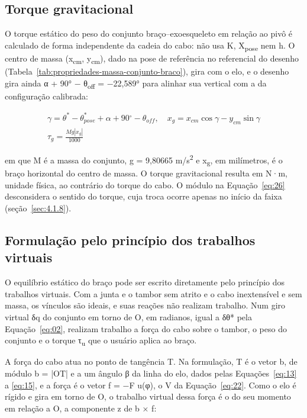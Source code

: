 \subsection{Torque gravitacional}\label{sec:3.1.8}

O torque estático do peso do conjunto braço–exoesqueleto em relação ao pivô é calculado de forma independente da cadeia do cabo: não usa K, X\textsubscript{pose} nem h. O centro de massa (x\textsubscript{cm}, y\textsubscript{cm}), dado na pose de referência no referencial do desenho (Tabela~\ref{tab:propriedades-massa-conjunto-braco}), gira com o elo, e o desenho gira ainda α + 90° − θ\textsubscript{off} = −22,589° para alinhar sua vertical com a da configuração calibrada:

\begin{gather}
  \gamma = \theta^{*} - \theta_{pose}^{*} + \alpha + 90{^\circ} - \theta_{off},\quad x_{g} = x_{cm}\cos\gamma - y_{cm}\sin\gamma \label{eq:25} \\
  \tau_{g} = \frac{Mg\left| x_{g} \right|}{1000} \label{eq:26}
\end{gather}

em que M é a massa do conjunto, g = 9,80665 m/s\textsuperscript{2} e x\textsubscript{g}, em milímetros, é o braço horizontal do centro de massa. O torque gravitacional resulta em N·m, unidade física, ao contrário do torque do cabo. O módulo na Equação~\eqref{eq:26} desconsidera o sentido do torque, cuja troca ocorre apenas no início da faixa (seção~\ref{sec:4.1.8}).

\subsection{Formulação pelo princípio dos trabalhos virtuais}\label{sec:3.1.9}

O equilíbrio estático do braço pode ser escrito diretamente pelo princípio dos trabalhos virtuais. Com a junta e o tambor sem atrito e o cabo inextensível e sem massa, os vínculos são ideais, e suas reações não realizam trabalho. Num giro virtual δq do conjunto em torno de O, em radianos, igual a δθ* pela Equação~\eqref{eq:02}, realizam trabalho a força do cabo sobre o tambor, o peso do conjunto e o torque τ\textsubscript{u} que o usuário aplica ao braço.

A força do cabo atua no ponto de tangência T. Na formulação, T é o vetor b, de módulo b = |OT| e a um ângulo β da linha do elo, dados pelas Equações~\eqref{eq:13} a \eqref{eq:15}, e a força é o vetor f = −F u(φ), o V da Equação~\eqref{eq:22}. Como o elo é rígido e gira em torno de O, o trabalho virtual dessa força é o do seu momento em relação a O, a componente z de b × f:

